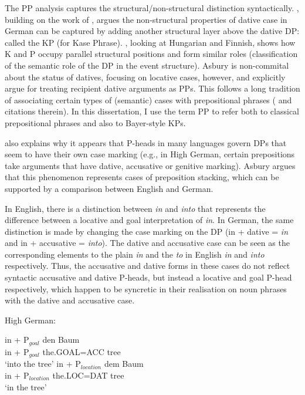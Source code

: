The PP analysis captures the structural/non-structural distinction syntactically. \cite{Bayer.2001}, building on the work of \cite{Bittner.1996}, argues the non-structural properties of dative case in German can be captured by adding another structural layer above the dative DP: called the KP (for Kase Phrase). \cite{Asbury.2005,Asbury.2007}, looking at Hungarian and Finnish, shows how K and P occupy parallel structural positions and form similar roles (classification of the semantic role of the DP in the event structure). Asbury is non-commital about the status of datives, focusing on locative cases, however, \cite{Rezac.2008} and \cite{Caha.2009} explicitly argue for treating recipient dative arguments as PPs. This follows a long tradition of associating certain types of (semantic) cases with prepositional phrases (\citealt{McFadden.2004} and citations therein). In this dissertation, I use the term PP to refer both to classical prepositional phrases and also to Bayer-style KPs.

\cite{Asbury.2005} also explains why it appears that P-heads in many languages govern DPs that seem to have their own case marking (e.g., in High German, certain prepositions take arguments that have dative, accusative or genitive marking). Asbury argues that this phenomenon represents cases of preposition stacking, which can be supported by a comparison between English and German. 

In English, there is a distinction between \textit{in} and \textit{into} that represents the difference between a locative and goal interpretation of \textit{in}. In German, the same distinction is made by changing the case marking on the DP (in + dative = \textit{in} and in + accusative = \textit{into}). The dative and accusative case can be seen as the corresponding elements to the plain \textit{in} and the \textit{to} in English \textit{in} and \textit{into} respectively. Thus, the accusative and dative forms in these cases do not reflect syntactic accusative and dative P-heads, but instead a locative and goal P-head respectively, which happen to be syncretic in their realisation on noun phrases with the dative and accusative case.

\begin{exe}
	\ex High German:\label{ex:hg-Pcomp}
	\begin{xlist}
		\ex \gll in + P$_{goal}$ den Baum\\
			 in + P$_{goal}$ the.GOAL=ACC tree\\
			 \trans `into the tree'
		\ex \gll in + P$_{location}$ dem Baum\\
			 in + P$_{location}$ the.LOC=DAT tree\\
			 \trans `in the tree'
	\end{xlist}

\end{exe}

